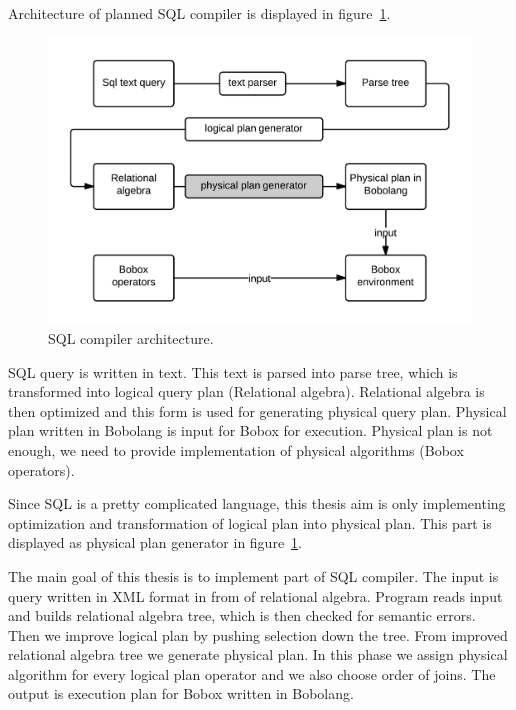 Architecture of planned SQL compiler is displayed in figure~\ref{fig:sqlarchitecture}. 
\begin{figure}[h!]
  \centering

    \includegraphics[width=1\textwidth]{sqlarchitecture}
    
      \caption{SQL compiler architecture.}
        \label{fig:sqlarchitecture}
\end{figure}
SQL query is written in text. This text is parsed into parse tree, which is transformed into logical query plan (Relational algebra). Relational algebra is then optimized and this form is used for generating physical query plan. Physical plan written in Bobolang is input for Bobox for execution. Physical plan is not enough, we need to provide implementation of physical algorithms (Bobox operators).

Since SQL is a pretty complicated language, this thesis aim is only implementing optimization and transformation of logical plan into physical plan. This part is displayed as physical plan generator in figure~\ref{fig:sqlarchitecture}.


The main goal of this thesis is to implement part of SQL compiler. The input is query written in XML format in from of relational algebra. Program reads input and builds relational algebra tree, which is then checked for semantic errors. Then we improve logical plan by pushing selection down the tree. From improved relational algebra tree we generate physical plan. In this phase we assign physical algorithm for every logical plan operator and we also choose order of joins. The output is execution plan for Bobox written in Bobolang.
